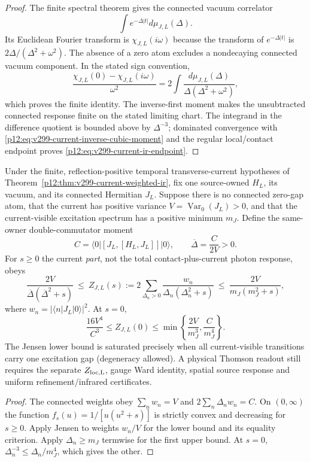 \documentclass[12pt,a4paper]{article}
\begin{document}
\begin{proof}
The finite spectral theorem gives the connected vacuum correlator
\[
\int e^{-\Delta|t|}d\mu_{J,L}(\Delta).
\]
Its Euclidean Fourier transform is $\chi_{J,L}(i\omega)$ because the
transform of $e^{-\Delta|t|}$ is $2\Delta/(\Delta^2+\omega^2)$.  The absence of a zero atom excludes a
nondecaying connected vacuum component.  In the stated sign convention,
\[
 \frac{\chi_{J,L}(0)-\chi_{J,L}(i\omega)}{\omega^2}
 =2\int\frac{d\mu_{J,L}(\Delta)}{\Delta(\Delta^2+\omega^2)},
\]
which proves the finite identity.  The inverse-first moment makes the
unsubtracted connected response finite on the stated limiting chart.  The
integrand in the difference quotient is bounded above by $\Delta^{-3}$;
dominated convergence with \eqref{p12:eq:v299-current-inverse-cubic-moment}
and the regular local/contact endpoint proves
\eqref{p12:eq:v299-current-ir-endpoint}.
\end{proof}

\begin{corollary}
\label{p12:cor:v340-s3lit-current-envelope}
Under the finite, reflection-positive temporal transverse-current
hypotheses of Theorem~\ref{p12:thm:v299-current-weighted-ir}, fix one
source-owned $H_L$, its vacuum, and its connected Hermitian $J_L$.
Suppose there is no connected zero-gap atom, that the current has
positive variance $V=\operatorname{Var}_0(J_L)>0$, and that the
current-visible excitation spectrum has a positive minimum $m_J$.
Define the same-owner double-commutator moment
\[
 C=\langle0|[J_L,[H_L,J_L]]|0\rangle,
 \qquad \overline\Delta=\frac{C}{2V}>0.
\]
For $s\ge0$ the current \emph{part}, not the total contact-plus-current
photon response, obeys
\[
 \frac{2V}{\overline\Delta(\overline\Delta^2+s)}
 \ \le\ Z_{J,L}(s):=
 2\sum_{\Delta_n>0}\frac{w_n}{\Delta_n(\Delta_n^2+s)}
 \ \le\ \frac{2V}{m_J(m_J^2+s)},
\]
where $w_n=|\langle n|J_L|0\rangle|^2$.  At $s=0$,
\[
 \frac{16V^4}{C^3}\le Z_{J,L}(0)
 \le\min\left\{\frac{2V}{m_J^3},\frac{C}{m_J^4}\right\}.
\]
The Jensen lower bound is saturated precisely when all
current-visible transitions carry one excitation gap (degeneracy
allowed).  A physical Thomson readout still requires the separate
$Z_{\rm loc,L}$, gauge Ward identity, spatial source response and
uniform refinement/infrared certificates.
\end{corollary}
\begin{proof}
The connected weights obey $\sum_nw_n=V$ and
$2\sum_n\Delta_nw_n=C$.  On $(0,\infty)$ the function
$f_s(u)=1/[u(u^2+s)]$ is strictly convex and decreasing for $s\ge0$.
Apply Jensen to weights $w_n/V$ for the lower bound and its equality
criterion.  Apply $\Delta_n\ge m_J$ termwise for the first upper bound.
At $s=0$, $\Delta_n^{-3}\le\Delta_n/m_J^4$, which gives the other.
\end{proof}
\end{document}
